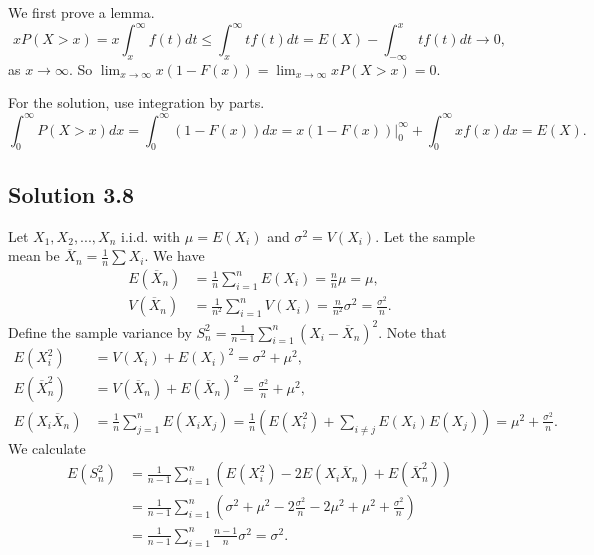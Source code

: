 We first prove a lemma.
\begin{equation*}
    x P(X > x) = x \int_x^{\infty} f(t) dt
        \leq \int_x^{\infty} t f(t) dt
        = E(X) - \int_{-\infty}^{x} t f(t) dt
        \to 0,
\end{equation*}
as $x \to \infty$.
So $\lim_{x \to \infty} x(1 - F(x)) = \lim_{x \to \infty} x P(X > x) = 0$.

For the solution, use integration by parts.
\begin{equation*}
    \int_0^{\infty} P(X > x) dx = \int_0^{\infty} (1 - F(x)) dx
        = x(1 - F(x))|_0^{\infty} + \int_0^{\infty} xf(x) dx
        = E(X).
\end{equation*}


\subsection*{Solution 3.8}

Let $X_1, X_2, ..., X_n$ i.i.d. with $\mu = E(X_i)$ and $\sigma^2 = V(X_i)$.
Let the sample mean be $\overline{X}_n = \frac{1}{n} \sum X_i$.
We have
\begin{equation*}
    \begin{split}
        E(\overline{X}_n) &= \frac{1}{n} \sum_{i = 1}^n E(X_i)
            = \frac{n}{n} \mu
            = \mu, \\
        V(\overline{X}_n) &= \frac{1}{n^2} \sum_{i = 1}^n V(X_i)
            = \frac{n}{n^2} \sigma^2
            = \frac{\sigma^2}{n}.
    \end{split}
\end{equation*}
Define the sample variance by $S^2_n = \frac{1}{n - 1} \sum_{i = 1}^n (X_i - \overline{X}_n)^2$.
Note that
\begin{equation*}
    \begin{split}
        E(X_i^2) &= V(X_i) + E(X_i)^2 = \sigma^2 + \mu^2, \\
        E(\overline{X}_n^2) &= V(\overline{X}_n) + E(\overline{X}_n)^2 = \frac{\sigma^2}{n} + \mu^2, \\
        E(X_i \overline{X}_n) &= \frac{1}{n} \sum_{j = 1}^n E(X_i X_j)
            = \frac{1}{n} \left(E(X_i^2) + \sum_{i \neq j} E(X_i) E(X_j)\right)
            = \mu^2 + \frac{\sigma^2}{n}.
    \end{split}
\end{equation*}
We calculate
\begin{equation*}
    \begin{split}
        E(S_n^2) &= \frac{1}{n - 1} \sum_{i = 1}^n \left(E(X_i^2) - 2 E(X_i \overline{X}_n) + E(\overline{X}_n^2)\right) \\
            &= \frac{1}{n - 1} \sum_{i = 1}^n \left(\sigma^2 + \mu^2 - 2 \frac{\sigma^2}{n} - 2 \mu^2 + \mu^2 + \frac{\sigma^2}{n}\right) \\
            &= \frac{1}{n - 1} \sum_{i = 1}^n \frac{n - 1}{n} \sigma^2
            = \sigma^2.
    \end{split}
\end{equation*}


